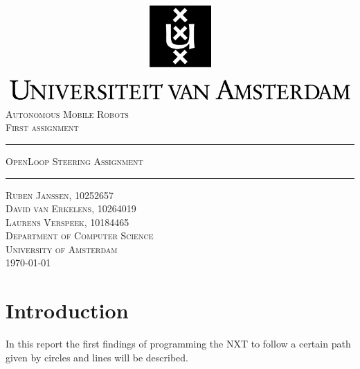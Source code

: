 \documentclass[12pt]{article}
\begin{document}
\begin{titlepage}
\begin{center}
    \includegraphics[width=\textwidth]{./logo.png}
    \\ [2.5cm]
    \textsc{\Large Autonomous Mobile Robots}
    \\ [0.5cm]
    \textsc{\large First assignment}
    \\ [1cm]
    \hrule
    \vspace{0.3cm}
    \textsc{OpenLoop Steering Assignment}
    \\ [0.3cm]
    \hrule
    \vfill
    \textsc{Ruben Janssen, 10252657 \\ David van Erkelens, 10264019 \\ Laurens Verspeek, 10184465 \\[0.7cm] Department of Computer Science \\ University of Amsterdam \\[0.3cm] \today}
\end{center}
\end{titlepage}
\tableofcontents
\clearpage
\section{Introduction}
In this report the first findings of programming the NXT to follow a certain path given by circles and lines will be described. 
\end{document}

